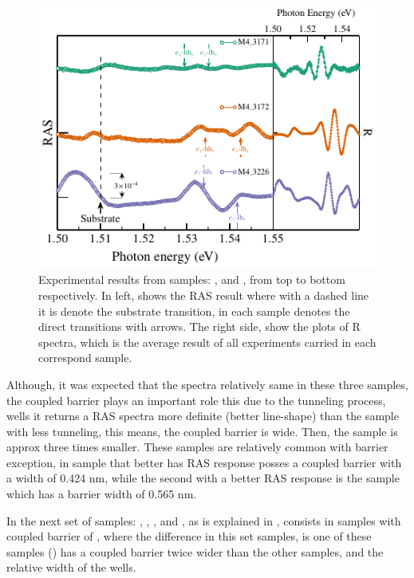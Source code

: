 \begin{figure}[H]
	\centering
	\includegraphics[width=\textwidth]{../figures/chapter-3/ras-plots/build-ruco/ras-set-1.pdf}
	\caption{Experimental results from samples: ,  and , from top to bottom respectively. In left, shows the RAS result where with a dashed line it is denote the substrate transition, in each sample denotes the direct transitions with arrows. The right side, show the plots of R spectra, which is the average result of all experiments carried in each correspond sample.   }
	\label{fig:chapter-3-subsec-ras-plots-set-1}
\end{figure}
Although, it was  expected that the spectra relatively same in these three samples, the coupled barrier plays an important role this due to the tunneling process,  wells it returns a \gls{RAS} spectra more definite (better line-shape) than the sample with less tunneling, this means, the coupled barrier is wide. Then, the sample  is approx three times smaller. These samples are relatively common with barrier exception, in sample  that  better has \gls{RAS} response posses a coupled barrier with a width of 0.424 nm, while the second with a better RAS response is the sample  which has a barrier width of 0.565 nm.  

In the next set of samples: ,  ,  ,   and  , as  is explained in , consists in samples with coupled barrier of , where the difference in this set samples, is one  of these samples () has a coupled barrier  twice wider than the other samples, and the relative width of the wells. 

